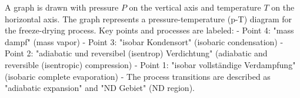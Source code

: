 A graph is drawn with pressure \( P \) on the vertical axis and temperature \( T \) on the horizontal axis. The graph represents a pressure-temperature (p-T) diagram for the freeze-drying process. Key points and processes are labeled:  
- Point 4: "mass dampf" (mass vapor)  
- Point 3: "isobar Kondensort" (isobaric condensation)  
- Point 2: "adiabatic und reversibel (isentrop) Verdichtung" (adiabatic and reversible (isentropic) compression)  
- Point 1: "isobar vollständige Verdampfung" (isobaric complete evaporation)  
- The process transitions are described as "adiabatic expansion" and "ND Gebiet" (ND region).